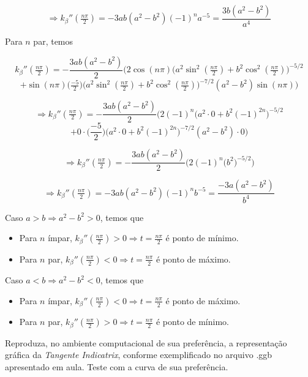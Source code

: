 \documentclass[../main.tex]{subfiles}
\begin{document}
\begin{solucao}
	\[
	\Rightarrow k_\beta''(\tfrac{n\pi}{2})=-3ab(a^2-b^2)(-1)^na^{-5}=\frac{3b(a^2-b^2)}{a^4}
	\]
	
	Para $n$ par, temos
	
	\[
	k_\beta''(\tfrac{n\pi}{2})=-\frac{3ab(a^2-b^2)}{2}\bigg(2\cos(n\pi)\big(a^2\sin^2(\tfrac{n\pi}{2}) + b^2\cos^2(\tfrac{n\pi}{2})\big)^{-5/2}
	\]
	\[
	+\sin(n\pi)\big(\tfrac{-5}{2}\big)\big(a^2\sin^2(\tfrac{n\pi}{2})+b^2\cos^2(\tfrac{n\pi}{2})\big)^{-7/2}(a^2-b^2)\sin(n\pi)\bigg)
	\]
	
	\[
	\Rightarrow k_\beta''(\tfrac{n\pi}{2})=-\frac{3ab(a^2-b^2)}{2}\bigg(2(-1)^n\big(a^2\cdot 0 + b^2(-1)^{2n}\big)^{-5/2}
	\]
	\[
	+0\cdot \big(\frac{-5}{2}\big)\big(a^2\cdot 0+b^2(-1)^{2n}\big)^{-7/2}(a^2-b^2)\cdot 0\bigg)
	\]
	
	\[
	\Rightarrow k_\beta''(\tfrac{n\pi}{2})=-\frac{3ab(a^2-b^2)}{2}\bigg(2(-1)^n\big(b^2)^{-5/2}\bigg)
	\]
	
	\[
	\Rightarrow k_\beta''(\tfrac{n\pi}{2})=-3ab(a^2-b^2)(-1)^nb^{-5}=\frac{-3a(a^2-b^2)}{b^4}
	\]
	
	Caso $a>b\Rightarrow a^2-b^2>0$, temos que
	\begin{itemize}
		\item Para $n$ ímpar, $k_\beta''(\tfrac{n\pi}{2})>0\Rightarrow t=\tfrac{n\pi}{2}$ é ponto de mínimo.
		\item Para $n$ par, $k_\beta''(\tfrac{n\pi}{2})<0\Rightarrow t=\tfrac{n\pi}{2}$ é ponto de máximo.
	\end{itemize}
	
	Caso $a<b\Rightarrow a^2-b^2<0$, temos que
	\begin{itemize}
		\item Para $n$ ímpar, $k_\beta''(\tfrac{n\pi}{2})<0\Rightarrow t=\tfrac{n\pi}{2}$ é ponto de máximo.
		\item Para $n$ par, $k_\beta''(\tfrac{n\pi}{2})>0\Rightarrow t=\tfrac{n\pi}{2}$ é ponto de mínimo.
	\end{itemize}
\end{solucao}

\begin{exercicio}{9}
	Reproduza, no ambiente computacional de sua preferência, a representação gráfica da \textit{Tangente Indicatrix}, conforme exemplificado no arquivo .ggb apresentado em aula. Teste com a curva de sua preferência.
\end{exercicio}
\end{document}
